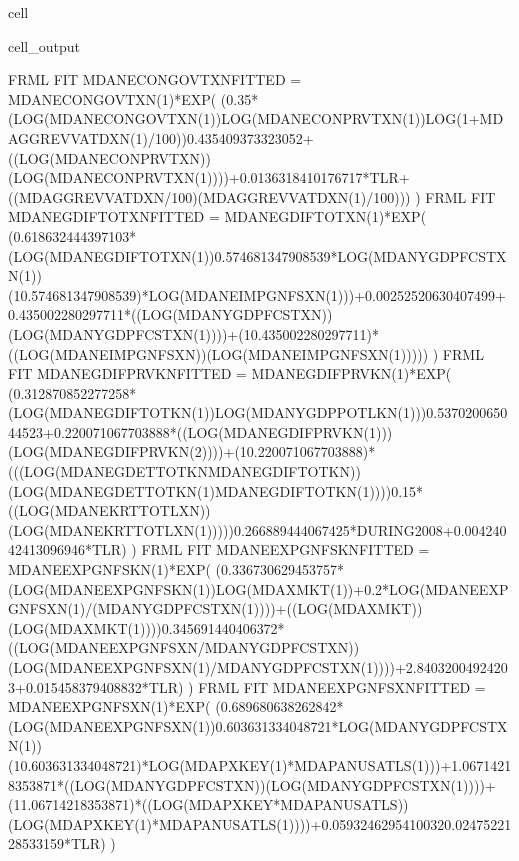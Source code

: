 \documentclass[letterpaper,10pt,english]{jupyterBook}
\begin{document}
\begin{sphinxuseclass}{cell}
\begin{sphinxVerbatimOutput}
\begin{sphinxuseclass}{cell_output}
\begin{sphinxVerbatim}[commandchars=\\\{\}]
FRML \PYGZlt{}FIT\PYGZgt{} MDANECONGOVTXN\PYGZus{}FITTED = MDANECONGOVTXN(\PYGZhy{}1)*EXP( (\PYGZhy{}0.35*(LOG(MDANECONGOVTXN(\PYGZhy{}1))\PYGZhy{}LOG(MDANECONPRVTXN(\PYGZhy{}1))\PYGZhy{}LOG(1+MDAGGREVVATDXN(\PYGZhy{}1)/100))\PYGZhy{}0.435409373323052+((LOG(MDANECONPRVTXN))\PYGZhy{}(LOG(MDANECONPRVTXN(\PYGZhy{}1))))+0.0136318410176717*T\PYGZus{}LR+((MDAGGREVVATDXN/100)\PYGZhy{}(MDAGGREVVATDXN(\PYGZhy{}1)/100))) ) \PYGZdl{}
FRML \PYGZlt{}FIT\PYGZgt{} MDANEGDIFTOTXN\PYGZus{}FITTED = MDANEGDIFTOTXN(\PYGZhy{}1)*EXP( (\PYGZhy{}0.618632444397103*(LOG(MDANEGDIFTOTXN(\PYGZhy{}1))\PYGZhy{}0.574681347908539*LOG(MDANYGDPFCSTXN(\PYGZhy{}1))\PYGZhy{}(1\PYGZhy{}0.574681347908539)*LOG(MDANEIMPGNFSXN(\PYGZhy{}1)))+0.00252520630407499+0.435002280297711*((LOG(MDANYGDPFCSTXN))\PYGZhy{}(LOG(MDANYGDPFCSTXN(\PYGZhy{}1))))+(1\PYGZhy{}0.435002280297711)*((LOG(MDANEIMPGNFSXN))\PYGZhy{}(LOG(MDANEIMPGNFSXN(\PYGZhy{}1))))) ) \PYGZdl{}
FRML \PYGZlt{}FIT\PYGZgt{} MDANEGDIFPRVKN\PYGZus{}FITTED = MDANEGDIFPRVKN(\PYGZhy{}1)*EXP( (\PYGZhy{}0.312870852277258*(LOG(MDANEGDIFTOTKN(\PYGZhy{}1))\PYGZhy{}LOG(MDANYGDPPOTLKN(\PYGZhy{}1)))\PYGZhy{}0.537020065044523+0.220071067703888*((LOG(MDANEGDIFPRVKN(\PYGZhy{}1)))\PYGZhy{}(LOG(MDANEGDIFPRVKN(\PYGZhy{}2))))+(1\PYGZhy{}0.220071067703888)*(((LOG(MDANEGDETTOTKN\PYGZhy{}MDANEGDIFTOTKN))\PYGZhy{}(LOG(MDANEGDETTOTKN(\PYGZhy{}1)\PYGZhy{}MDANEGDIFTOTKN(\PYGZhy{}1))))\PYGZhy{}0.15*((LOG(MDANEKRTTOTLXN))\PYGZhy{}(LOG(MDANEKRTTOTLXN(\PYGZhy{}1)))))\PYGZhy{}0.266889444067425*DURING\PYGZus{}2008+0.00424042413096946*T\PYGZus{}LR) ) \PYGZdl{}
FRML \PYGZlt{}FIT\PYGZgt{} MDANEEXPGNFSKN\PYGZus{}FITTED = MDANEEXPGNFSKN(\PYGZhy{}1)*EXP( (\PYGZhy{}0.336730629453757*(LOG(MDANEEXPGNFSKN(\PYGZhy{}1))\PYGZhy{}LOG(MDAXMKT(\PYGZhy{}1))+0.2*LOG(MDANEEXPGNFSXN(\PYGZhy{}1)/(MDANYGDPFCSTXN(\PYGZhy{}1))))+((LOG(MDAXMKT))\PYGZhy{}(LOG(MDAXMKT(\PYGZhy{}1))))\PYGZhy{}0.345691440406372*((LOG(MDANEEXPGNFSXN/MDANYGDPFCSTXN))\PYGZhy{}(LOG(MDANEEXPGNFSXN(\PYGZhy{}1)/MDANYGDPFCSTXN(\PYGZhy{}1))))+2.84032004924203+0.015458379408832*T\PYGZus{}LR) ) \PYGZdl{}
FRML \PYGZlt{}FIT\PYGZgt{} MDANEEXPGNFSXN\PYGZus{}FITTED = MDANEEXPGNFSXN(\PYGZhy{}1)*EXP( (\PYGZhy{}0.689680638262842*(LOG(MDANEEXPGNFSXN(\PYGZhy{}1))\PYGZhy{}0.603631334048721*LOG(MDANYGDPFCSTXN(\PYGZhy{}1))\PYGZhy{}(1\PYGZhy{}0.603631334048721)*LOG(MDAPXKEY(\PYGZhy{}1)*MDAPANUSATLS(\PYGZhy{}1)))+1.06714218353871*((LOG(MDANYGDPFCSTXN))\PYGZhy{}(LOG(MDANYGDPFCSTXN(\PYGZhy{}1))))+(1\PYGZhy{}1.06714218353871)*((LOG(MDAPXKEY*MDAPANUSATLS))\PYGZhy{}(LOG(MDAPXKEY(\PYGZhy{}1)*MDAPANUSATLS(\PYGZhy{}1))))+0.0593246295410032\PYGZhy{}0.0247522128533159*T\PYGZus{}LR) ) \PYGZdl{}

\end{sphinxVerbatim}
\end{sphinxuseclass}
\end{sphinxVerbatimOutput}
\end{sphinxuseclass}
\end{document}
